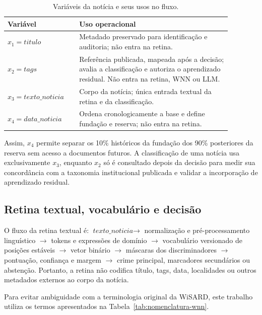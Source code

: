 \begin{table}[ht]
\centering
\caption{Variáveis da notícia e seus usos no fluxo.}
\label{tab:variaveis-noticia}
\begin{tabular}{p{0.28\linewidth}>{\hyphenpenalty=50\exhyphenpenalty=50\tolerance=1000\arraybackslash}p{0.60\linewidth}}
\hline
\textbf{Variável} & \textbf{Uso operacional} \\
\hline
\mbox{$x_1=\textit{titulo}$} & Metadado preservado para identificação e auditoria; não entra na retina. \\
\mbox{$x_2=\textit{tags}$} & Referência publicada, mapeada após a decisão; avalia a classificação e autoriza o aprendizado residual. Não entra na retina, WNN ou LLM. \\
\mbox{$x_3=\textit{texto\_noticia}$} & Corpo da notícia; única entrada textual da retina e da classificação. \\
\mbox{$x_4=\textit{data\_noticia}$} & Ordena cronologicamente a base e define fundação e reserva; não entra na retina. \\
\hline
\end{tabular}
\end{table}

Assim, $x_4$ permite separar os 10\% históricos da fundação dos 90\% posteriores da reserva sem acesso a documentos futuros. A classificação de uma notícia usa exclusivamente $x_3$, enquanto $x_2$ só é consultado depois da decisão para medir sua concordância com a taxonomia institucional publicada e validar a incorporação de aprendizado residual.

\subsection{Retina textual, vocabulário e decisão}

O fluxo da retina textual é: $\textit{texto\_noticia}\rightarrow$ normalização e pré-processamento linguístico $\rightarrow$ tokens e expressões de domínio $\rightarrow$ vocabulário versionado de posições estáveis $\rightarrow$ vetor binário $\rightarrow$ máscaras dos discriminadores $\rightarrow$ pontuação, confiança e margem $\rightarrow$ crime principal, marcadores secundários ou abstenção. Portanto, a retina não codifica título, tags, data, localidades ou outros metadados externos ao corpo da notícia.

Para evitar ambiguidade com a terminologia original da WiSARD, este trabalho utiliza os termos apresentados na Tabela~\ref{tab:nomenclatura-wnn}.

